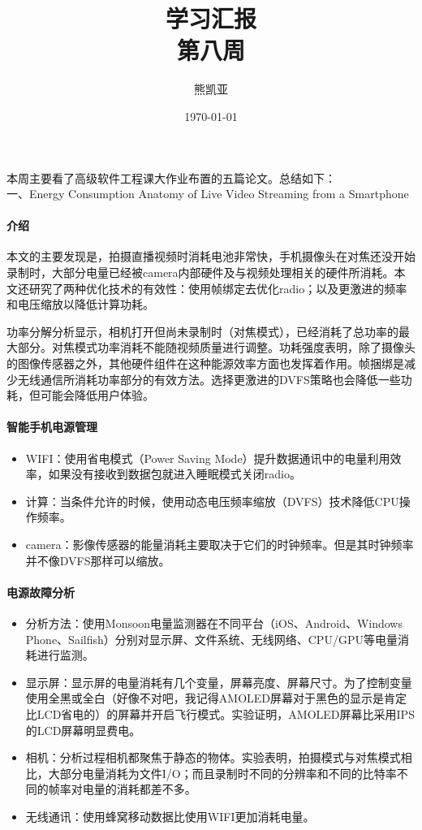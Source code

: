 \documentclass[a4paper]{article}
\title{学习汇报\\第八周}
\author{熊凯亚}
\date{\today}
\begin{document}
\maketitle

本周主要看了高级软件工程课大作业布置的五篇论文。总结如下：\\
一、Energy Consumption Anatomy of Live Video Streaming from a Smartphone

\paragraph{介绍}							
本文的主要发现是，拍摄直播视频时消耗电池非常快，手机摄像头在对焦还没开始录制时，大部分电量已经被camera内部硬件及与视频处理相关的硬件所消耗。本文还研究了两种优化技术的有效性：使用帧绑定去优化radio；以及更激进的频率和电压缩放以降低计算功耗。

功率分解分析显示，相机打开但尚未录制时（对焦模式），已经消耗了总功率的最大部分。对焦模式功率消耗不能随视频质量进行调整。功耗强度表明，除了摄像头的图像传感器之外，其他硬件组件在这种能源效率方面也发挥着作用。帧捆绑是减少无线通信所消耗功率部分的有效方法。选择更激进的DVFS策略也会降低一些功耗，但可能会降低用户体验。

\paragraph{智能手机电源管理}
\begin{itemize}
\item WIFI：使用省电模式（Power Saving Mode）提升数据通讯中的电量利用效率，如果没有接收到数据包就进入睡眠模式关闭radio。
\item 计算：当条件允许的时候，使用动态电压频率缩放（DVFS）技术降低CPU操作频率。
\item camera：影像传感器的能量消耗主要取决于它们的时钟频率。但是其时钟频率并不像DVFS那样可以缩放。
\end{itemize}
\paragraph{电源故障分析}
\begin{itemize}
\item 分析方法：使用Monsoon电量监测器在不同平台（iOS、Android、Windows Phone、Sailfish）分别对显示屏、文件系统、无线网络、CPU/GPU等电量消耗进行监测。
\item 显示屏：显示屏的电量消耗有几个变量，屏幕亮度、屏幕尺寸。为了控制变量使用全黑或全白（好像不对吧，我记得AMOLED屏幕对于黑色的显示是肯定比LCD省电的）的屏幕并开启飞行模式。实验证明，AMOLED屏幕比采用IPS的LCD屏幕明显费电。
\item 相机：分析过程相机都聚焦于静态的物体。实验表明，拍摄模式与对焦模式相比，大部分电量消耗为文件I/O；而且录制时不同的分辨率和不同的比特率不同的帧率对电量的消耗都差不多。
\item 无线通讯：使用蜂窝移动数据比使用WIFI更加消耗电量。
\end{itemize}
\end{document}
